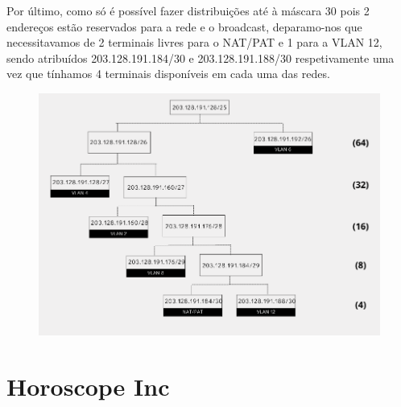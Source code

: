 \documentclass{report}
\begin{document}
Por último, como só é possível fazer distribuições até à máscara 30 pois 2 endereços estão reservados para a rede e o broadcast, deparamo-nos que necessitavamos de 2 terminais livres para o NAT/PAT e 1 para a VLAN 12, sendo atribuídos 203.128.191.184/30 e 203.128.191.188/30 respetivamente uma vez que tínhamos 4 terminais disponíveis em cada uma das redes.

\newpage
\clearpage
\begin{figure}[H]
    \hspace*{-4.0cm}
    \centering
    \includegraphics[width=20cm]{code/images/CalendarInc-IPv4 Publico.png}
\end{figure}

\newpage
\section*{Horoscope Inc}
\end{document}
